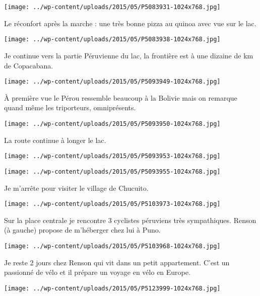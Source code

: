 \begin{center} \texttt{[image: ../wp-content/uploads/2015/05/P5083931-1024x768.jpg]} \end{center}

Le réconfort après la marche : une très bonne pizza au quinoa avec vue sur le lac. 
\begin{center} \texttt{[image: ../wp-content/uploads/2015/05/P5083938-1024x768.jpg]} \end{center}
\pagebreak

Je continue vers la partie Péruvienne du lac, la frontière est à une dizaine de km de Copacabana. 
\begin{center} \texttt{[image: ../wp-content/uploads/2015/05/P5093949-1024x768.jpg]} \end{center}

À première vue le Pérou ressemble beaucoup à la Bolivie mais on remarque quand même les triporteurs, omniprésents. 
\begin{center} \texttt{[image: ../wp-content/uploads/2015/05/P5093950-1024x768.jpg]} \end{center}
\pagebreak

La route continue à longer le lac. 
\begin{center} \texttt{[image: ../wp-content/uploads/2015/05/P5093953-1024x768.jpg]} \end{center}
\begin{center} \texttt{[image: ../wp-content/uploads/2015/05/P5093955-1024x768.jpg]} \end{center}
\pagebreak

Je m'arrête pour visiter le village de Chucuito. 
\begin{center} \texttt{[image: ../wp-content/uploads/2015/05/P5103973-1024x768.jpg]} \end{center}

Sur la place centrale je rencontre 3 cyclistes péruviens très sympathiques. Renson (à gauche) propose de m'héberger chez lui à Puno. 
\begin{center} \texttt{[image: ../wp-content/uploads/2015/05/P5103968-1024x768.jpg]} \end{center}
\pagebreak

Je reste 2 jours chez Renson qui vit dans un petit appartement. C'est un passionné de vélo et il prépare un voyage en vélo en Europe. 
\begin{center} \texttt{[image: ../wp-content/uploads/2015/05/P5123999-1024x768.jpg]} \end{center}

